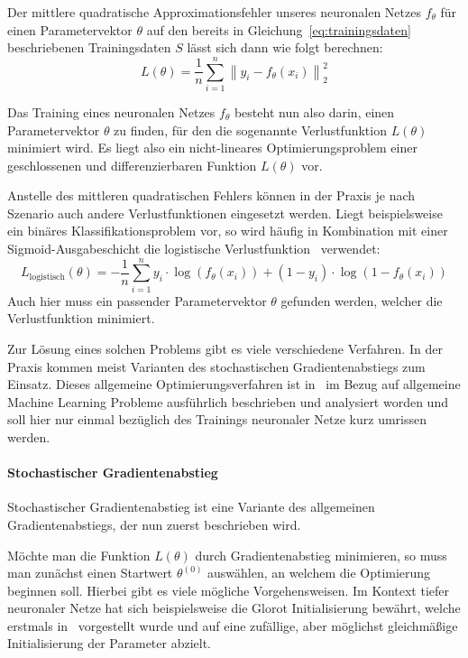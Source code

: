 Der mittlere quadratische Approximationsfehler unseres neuronalen Netzes
$f_\theta$ f\"ur einen Parametervektor $\theta$ auf den bereits
in Gleichung~\ref{eq:trainingsdaten} beschriebenen Trainingsdaten $S$
l\"asst sich dann wie folgt berechnen:
\begin{equation}
    L(\theta) = \frac{1}{n} \sum_{i=1}^n \left\lVert y_i - f_\theta(x_i) \right\lVert_2^2
\end{equation}

Das Training eines neuronalen Netzes $f_\theta$ besteht nun also darin,
einen Parametervektor $\theta$ zu finden, f\"ur den die sogenannte
Verlustfunktion $L(\theta)$ minimiert wird.
Es liegt also ein nicht-lineares Optimierungsproblem einer geschlossenen
und differenzierbaren Funktion $L(\theta)$ vor.

Anstelle des mittleren quadratischen Fehlers k\"onnen in der Praxis
je nach Szenario auch andere Verlustfunktionen eingesetzt werden.
Liegt beispielsweise ein bin\"ares Klassifikationsproblem vor,
so wird h\"aufig in Kombination mit einer Sigmoid-Ausgabeschicht
die logistische Verlustfunktion~\cite{Goodfellow-et-al-2016} verwendet:
\begin{equation}
    L_\text{logistisch}(\theta) = -\frac{1}{n}
    \sum_{i=1}^n y_i \cdot \log (f_\theta(x_i)) + (1 - y_i) \cdot \log (1 - f_\theta(x_i))
\end{equation}
Auch hier muss ein passender Parametervektor $\theta$ gefunden werden,
welcher die
Verlustfunktion minimiert.

Zur L\"osung eines solchen Problems gibt es viele verschiedene Verfahren.
In der Praxis kommen meist Varianten des stochastischen Gradientenabstiegs
zum Einsatz. Dieses allgemeine Optimierungsverfahren ist in~\cite{understanding_ml}
im Bezug auf allgemeine Machine Learning Probleme ausf\"uhrlich beschrieben
und analysiert worden und soll hier nur einmal bez\"uglich des Trainings
neuronaler Netze kurz umrissen werden.

\paragraph{Stochastischer Gradientenabstieg}

Stochastischer Gradientenabstieg ist eine Variante des
allgemeinen Gradientenabstiegs, der nun zuerst beschrieben wird.

M\"ochte man die Funktion $L(\theta)$ durch Gradientenabstieg
minimieren, so muss man zun\"achst einen Startwert $\theta^{(0)}$
ausw\"ahlen, an welchem die Optimierung beginnen soll.
Hierbei gibt es viele m\"ogliche Vorgehensweisen.
Im Kontext tiefer neuronaler Netze hat sich beispielsweise die
Glorot Initialisierung bew\"ahrt, welche erstmals in~\cite{glorot_init}
vorgestellt wurde und auf eine zuf\"allige, aber m\"oglichst gleichm\"a{\ss}ige
Initialisierung der Parameter abzielt.

